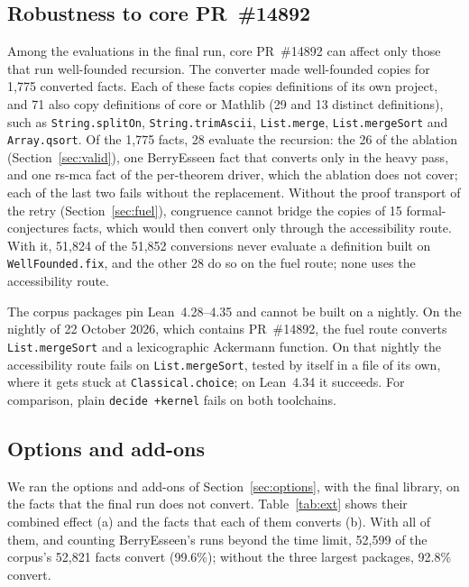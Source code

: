 \documentclass[11pt]{article}
\begin{document}
\subsection{Robustness to core PR~\#14892}\label{sec:durable}
Among the evaluations in the final run, core PR~\#14892 can affect only those that run well-founded
recursion. The converter made well-founded copies for 1,775 converted facts. Each of these facts copies
definitions of its own project, and 71 also copy definitions of core or Mathlib (29 and 13 distinct
definitions), such as \texttt{String.splitOn}, \texttt{String.trimAscii}, \texttt{List.merge},
\texttt{List.mergeSort} and \texttt{Array.qsort}. Of the 1,775 facts, 28 evaluate the recursion: the 26 of
the ablation (Section~\ref{sec:valid}), one BerryEsseen fact that converts only in the heavy pass, and one
rs-mca fact of the per-theorem driver, which the ablation does not cover; each of the last two fails without
the replacement. Without the proof transport of the retry (Section~\ref{sec:fuel}), congruence cannot
bridge the copies of 15 formal-conjectures facts, which would then convert only through the accessibility
route. With it, 51,824 of the 51,852 conversions never evaluate a definition built on
\texttt{WellFounded.fix}, and the other 28 do so on the fuel route; none uses the accessibility route.

The corpus packages pin Lean~4.28--4.35 and cannot be built on a nightly. On the nightly of 22 October 2026,
which contains PR~\#14892, the fuel route converts \texttt{List.mergeSort} and a lexicographic Ackermann
function. On that nightly the accessibility route fails on \texttt{List.mergeSort}, tested by itself in a file
of its own, where it gets stuck at \texttt{Classical.choice}; on Lean~4.34 it succeeds. For comparison, plain
\texttt{decide +kernel} fails on both toolchains.

\subsection{Options and add-ons}\label{sec:closing}
We ran the options and add-ons of Section~\ref{sec:options}, with the final library, on the facts that the
final run does not convert. Table~\ref{tab:ext} shows their combined effect (a) and the facts that each of
them converts (b). With all of them, and counting BerryEsseen's runs beyond the time limit,
52,599 of the corpus's 52,821 facts convert (99.6\%); without the three largest packages, 92.8\% convert.
\end{document}
